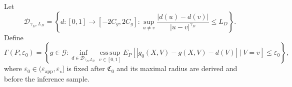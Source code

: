 Let
\[
 \mathcal D_{\gamma_D,L_D}
 =\left\{d:[0,1]\to[-2C_g,2C_g]:
 \sup_{u\ne v}\frac{|d(u)-d(v)|}{|u-v|^{\gamma_D}}\le L_D\right\}.
\]
Define
\[
 \Gamma(P,\varepsilon_0)
 =\left\{g\in\mathcal G:
 \inf_{d\in\mathcal D_{\gamma_D,L_D}}
 \operatorname*{ess\,sup}_{v\in[0,1]}
 E_P[|g_0(X,V)-g(X,V)-d(V)|\mid V=v]
 \le\varepsilon_0\right\},
\]
where \(\varepsilon_0\in(\varepsilon_{\mathrm{app}},\varepsilon_\star]\) is fixed after \(\mathfrak C_0\) and its maximal radius are derived and before the inference sample.